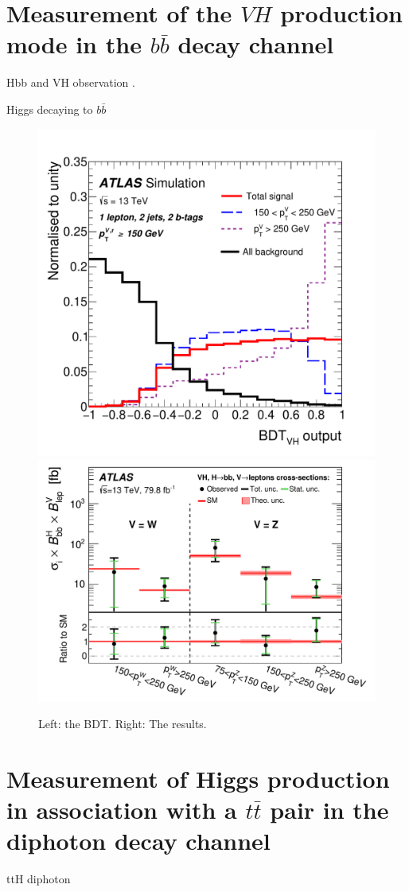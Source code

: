 \documentclass{moriond}
\begin{document}
\section{Measurement of the $VH$ production mode in the $b\bar b$ decay channel}\label{sec:vh_bb}

Hbb and VH observation \cite{HIGG-2018-04}.

Higgs decaying to $b\bar b$ \cite{HIGG-2018-50}

\begin{figure}[!htbp]
\centering
\includegraphics[width=0.425\linewidth]{figures/HIGG-2018-50/fig_01_v1.pdf}
\includegraphics[width=0.565\linewidth]{figures/HIGG-2018-50/fig_03.pdf}
\caption{
  Left: the BDT. Right: The results.
}
\label{fig:vh_bb}
\end{figure}

\section{Measurement of Higgs production in association with a $t\bar t$ pair in the diphoton decay channel}\label{sec:ttH_yy}

ttH diphoton \cite{ATLAS-CONF-2019-004}
\end{document}
